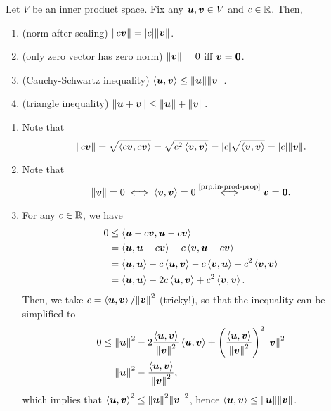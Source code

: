 \begin{enumerate}
\begin{proposition}
\label{prp:norm-prop}
Let \(V\) be an inner product space. Fix any \(\vb*{u},\vb*{v}\in V\) and
\(c\in\mathbb{R}\). Then,
\begin{enumerate}
\item (norm after scaling) \(\norm{c\vb*{v}}=|c|\norm{\vb*{v}}\).
\item (only zero vector has zero norm) \(\norm{\vb*{v}}=0\) iff \(\vb*{v}=\vb*{0}\).
\item (Cauchy-Schwartz inequality) \(\left\langle \vb*{u},\vb*{v}\right\rangle\le\norm{\vb*{u}}\norm{\vb*{v}}\).
\item (triangle inequality) \(\norm{\vb*{u}+\vb*{v}}\le\norm{\vb*{u}}+\norm{\vb*{v}}\).
\end{enumerate}
\end{proposition}
\begin{pf}
\begin{enumerate}
\item Note that
\[
\|c\vb*{v}\|=\sqrt{\left\langle c\vb*{v},c\vb*{v}\right\rangle}
=\sqrt{c^2\left\langle \vb*{v},\vb*{v}\right\rangle}
=|c|\sqrt{\left\langle \vb*{v},\vb*{v}\right\rangle}
=|c|\norm{\vb*{v}}.
\]
\item Note that
\[
\norm{\vect{v}}=0
\iff \inner{\vect{v}}{\vect{v}}=0
\overset{\text{\Cref{prp:in-prod-prop}}}{\iff}\vect{v}=\vect{0}.
\]
\item For any \(c\in\mathbb{R}\), we have
\begin{align*}
0&\le\left\langle \vb*{u}-c\vb*{v},\vb*{u}-c\vb*{v}\right\rangle \\
&=\left\langle \vb*{u},\vb*{u}-c\vb*{v}\right\rangle
-c\left\langle \vb*{v},\vb*{u}-c\vb*{v}\right\rangle
 \\
&=\left\langle \vb*{u},\vb*{u}\right\rangle-c\left\langle \vb*{u},\vb*{v}\right\rangle-c\left\langle 
\vb*{v},\vb*{u}\right\rangle+c^{2}\left\langle \vb*{v},\vb*{v}\right\rangle \\
&=\left\langle \vb*{u},\vb*{u}\right\rangle-2c\left\langle \vb*{u},\vb*{v}\right\rangle+c^{2}\left\langle \vb*{v},\vb*{v}\right\rangle.
\end{align*}
Then, we take \(c=\left\langle \vb*{u},\vb*{v}\right\rangle/\norm{\vb*{v}}^{2}\)
(tricky!), so that the inequality can be simplified to
\begin{align*}
0&\le\norm{\vb*{u}}^{2}
-2\frac{\left\langle \vb*{u},\vb*{v}\right\rangle}{\norm{\vb*{v}}^{2}}\left\langle \vb*{u},\vb*{v}\right\rangle
+\qty(\frac{\left\langle \vb*{u},\vb*{v}\right\rangle}{\norm{\vb*{v}}^{2}})^{2}\norm{\vb*{v}}^{2} \\
&=\norm{\vb*{u}}^{2}-\frac{\left\langle \vb*{u},\vb*{v}\right\rangle}{\norm{\vb*{v}}^{2}},
\end{align*}
which implies that \(\left\langle \vb*{u},\vb*{v}\right\rangle^{2}\le\norm{\vb*{u}}^{2}\norm{\vb*{v}}^{2}\), hence \(\left\langle \vb*{u},\vb*{v}\right\rangle\le\norm{\vb*{u}}\norm{\vb*{v}}\).

\end{enumerate}
\end{pf}
\end{enumerate}
